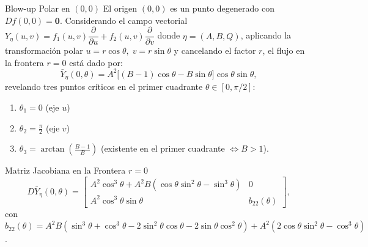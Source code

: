 \documentclass[10pt, aspectratio=169]{beamer}
\begin{document}
	\begin{frame}{Blow-up Polar en $(0,0)$}
		El origen $(0,0)$ es un punto degenerado con $Df(0,0) = \mathbf{0}$. Considerando el campo vectorial $Y_{\eta}(u,v)=f_1(u,v)\dfrac{\partial}{\partial u}+f_2(u,v)\dfrac{\partial}{\partial v}$ donde $\eta=(A,B,Q)$, aplicando la transformación polar $u = r \cos\theta, \; v = r \sin\theta$ y cancelando el factor $r$, el flujo en la frontera $r=0$ está dado por:
		\begin{equation*}
			\bar{Y}_\eta(0,\theta) = A^2 \big[(B-1)\cos\theta - B\sin\theta\big] \cos\theta \sin\theta,
		\end{equation*}
		revelando tres puntos críticos en el primer cuadrante $\theta \in [0, \pi/2]$:
		\begin{enumerate}
			\item $\theta_1 = 0$ (eje $u$)
			\item $\theta_2 = \frac{\pi}{2}$ (eje $v$)
			\item $\theta_3 = \arctan\left(\frac{B-1}{B}\right)$ (existente en el primer cuadrante $\iff B > 1$).
		\end{enumerate}
		
		\begin{block}{Matriz Jacobiana en la Frontera $r=0$}
			\begin{equation*}
				D\bar{Y}_\eta(0,\theta) = \begin{bmatrix}
					A^2 \cos^3\theta + A^2 B (\cos\theta\sin^2\theta - \sin^3\theta) & 0 \\[4pt]
					A^2 \cos^3\theta \sin\theta & b_{22}(\theta)
				\end{bmatrix},
			\end{equation*}
			con $b_{22}(\theta) = A^2 B (\sin^3\theta + \cos^3\theta - 2\sin^2\theta\cos\theta - 2\sin\theta\cos^2\theta) + A^2 (2\cos\theta\sin^2\theta - \cos^3\theta)$.
		\end{block}
	\end{frame}
	
\end{document}
